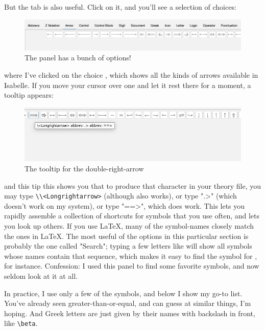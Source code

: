 But the  tab is also useful. Click on it, and you'll see a selection of choices:
\begin{figure} [h]
    \centering
    \includegraphics[width=0.75\linewidth]{C02//Images/symbols.png}
    \caption{The  panel has a bunch of options!}
    \label{fig:symbols-panel}
\end{figure}
\noindent 
where I've clicked on the choice , which shows all the kinds of arrows available in Isabelle. If you move your cursor over one and let it rest there for a moment, a tooltip appears:
\begin{figure}
    \centering
    \includegraphics[width=0.5\linewidth]{C02//Images/tooltip.png}
    \caption{The tooltip for the double-right-arrow}
    \label{fig:double-right}
\end{figure}
and this tip this shows you that to produce that character in your theory file, you may type \verb|\\<Longrightarrow>| (although \isi{\\Longrightarrow} also works), or type ".>" (which doesn't work on my system), or type "==>", which does work. This lets you rapidly assemble a collection of shortcuts for symbols that you use often, and lets you look up others. If you use LaTeX, many of the symbol-names closely match the ones in LaTeX. The most useful of the options in this particular section is probably the one called "Search"; typing a few letters like  will show all symbols whose names contain that sequence, which makes it easy to find the symbol for , for instance. Confession: I used this panel to find some favorite symbols, and now seldom look at it at all. 

In practice, I use only a few of the symbols, and below I show my go-to list. You've already seen greater-than-or-equal, and can guess at similar things, I'm hoping. And Greek letters are just given by their names with backslash in front, like \verb!\beta!.

